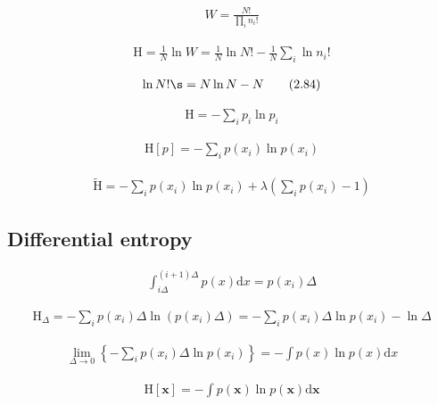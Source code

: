 \documentclass{article}
\begin{document}
\begin{align*}
W = \frac{N!}{\prod_{i} n_{i}!} 
\tag{2.82}
\end{align*}

\begin{align*}
\mathrm{H} = \frac{1}{N} \ln W = \frac{1}{N} \ln N! - \frac{1}{N} \sum_{i} \ln n_{i}! 
\tag{2.83}
\end{align*}

\begin{align*}
\ln N! \s = N \ln N - N 
\tag{2.84}
\end{align*}

\begin{align*}
\mathrm{H} = - \sum_{i} p_{i} \ln p_{i} 
\tag{2.85}
\end{align*}

\begin{align*}
\mathrm{H}[p] = -\sum_{i} p\left(x_{i}\right) \ln p\left(x_{i}\right) 
\tag{2.86}
\end{align*}

\begin{align*}
\widetilde{\mathrm{H}} = -\sum_{i} p\left(x_{i}\right) \ln p\left(x_{i}\right) + \lambda\left(\sum_{i} p\left(x_{i}\right) - 1\right) 
\tag{2.87}
\end{align*}

\subsection{Differential entropy}

\begin{align*}
\int_{i \Delta}^{(i+1) \Delta} p(x) \mathrm{d} x = p\left(x_{i}\right) \Delta 
\tag{2.89}
\end{align*}

\begin{align*}
\mathrm{H}_{\Delta} = -\sum_{i} p\left(x_{i}\right) \Delta \ln \left(p\left(x_{i}\right) \Delta\right) = -\sum_{i} p\left(x_{i}\right) \Delta \ln p\left(x_{i}\right) - \ln \Delta 
\tag{2.90}
\end{align*}

\begin{align*}
\lim_{\Delta \rightarrow 0}\left\{-\sum_{i} p\left(x_{i}\right) \Delta \ln p\left(x_{i}\right)\right\} = -\int p(x) \ln p(x) \mathrm{d} x 
\tag{2.91}
\end{align*}

\begin{align*}
\mathrm{H}[\mathbf{x}] = -\int p(\mathbf{x}) \ln p(\mathbf{x}) \mathrm{d} \mathbf{x} 
\tag{2.92}
\end{align*}
\end{document}
